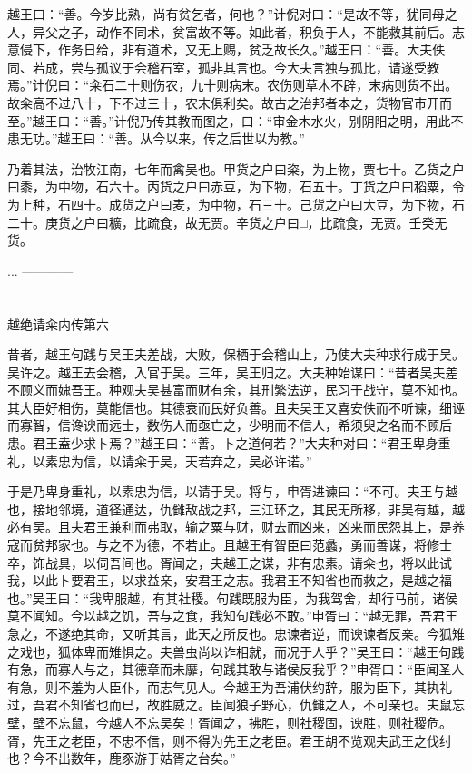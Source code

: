 \documentclass[12pt,UTF8]{ctexbook}
\begin{document}
越王曰：“善。今岁比熟，尚有贫乞者，何也？”计倪对曰：“是故不等，犹同母之人，异父之子，动作不同术，贫富故不等。如此者，积负于人，不能救其前后。志意侵下，作务日给，非有道术，又无上赐，贫乏故长久。”越王曰：“善。大夫佚同、若成，尝与孤议于会稽石室，孤非其言也。今大夫言独与孤比，请遂受教焉。”计倪曰：“籴石二十则伤农，九十则病末。农伤则草木不辟，末病则货不出。故籴高不过八十，下不过三十，农末俱利矣。故古之治邦者本之，货物官市开而至。”越王曰：“善。”计倪乃传其教而图之，曰：“审金木水火，别阴阳之明，用此不患无功。”越王曰：“善。从今以来，传之后世以为教。”

乃着其法，治牧江南，七年而禽吴也。甲货之户曰粢，为上物，贾七十。乙货之户曰黍，为中物，石六十。丙货之户曰赤豆，为下物，石五十。丁货之户曰稻粟，令为上种，石四十。成货之户曰麦，为中物，石三十。己货之户曰大豆，为下物，石二十。庚货之户曰穬，比疏食，故无贾。辛货之户曰□，比疏食，无贾。壬癸无货。

...
------------

\part{}

越绝请籴内传第六

昔者，越王句践与吴王夫差战，大败，保栖于会稽山上，乃使大夫种求行成于吴。吴许之。越王去会稽，入官于吴。三年，吴王归之。大夫种始谋曰：“昔者吴夫差不顾义而媿吾王。种观夫吴甚富而财有余，其刑繁法逆，民习于战守，莫不知也。其大臣好相伤，莫能信也。其德衰而民好负善。且夫吴王又喜安佚而不听谏，细诬而寡智，信谗谀而远士，数伤人而亟亡之，少明而不信人，希须臾之名而不顾后患。君王盍少求卜焉？”越王曰：“善。卜之道何若？”大夫种对曰：“君王卑身重礼，以素忠为信，以请籴于吴，天若弃之，吴必许诺。”

于是乃卑身重礼，以素忠为信，以请于吴。将与，申胥进谏曰：“不可。夫王与越也，接地邻境，道径通达，仇雠敌战之邦，三江环之，其民无所移，非吴有越，越必有吴。且夫君王兼利而弗取，输之粟与财，财去而凶来，凶来而民怨其上，是养寇而贫邦家也。与之不为德，不若止。且越王有智臣曰范蠡，勇而善谋，将修士卒，饰战具，以伺吾间也。胥闻之，夫越王之谋，非有忠素。请籴也，将以此试我，以此卜要君王，以求益亲，安君王之志。我君王不知省也而救之，是越之福也。”吴王曰：“我卑服越，有其社稷。句践既服为臣，为我驾舍，却行马前，诸侯莫不闻知。今以越之饥，吾与之食，我知句践必不敢。”申胥曰：“越无罪，吾君王急之，不遂绝其命，又听其言，此天之所反也。忠谏者逆，而谀谏者反亲。今狐雉之戏也，狐体卑而雉惧之。夫兽虫尚以诈相就，而况于人乎？”吴王曰：“越王句践有急，而寡人与之，其德章而未靡，句践其敢与诸侯反我乎？”申胥曰：“臣闻圣人有急，则不羞为人臣仆，而志气见人。今越王为吾浦伏约辞，服为臣下，其执礼过，吾君不知省也而已，故胜威之。臣闻狼子野心，仇雠之人，不可亲也。夫鼠忘壁，壁不忘鼠，今越人不忘吴矣！胥闻之，拂胜，则社稷固，谀胜，则社稷危。胥，先王之老臣，不忠不信，则不得为先王之老臣。君王胡不览观夫武王之伐纣也？今不出数年，鹿豕游于姑胥之台矣。”
\end{document}
